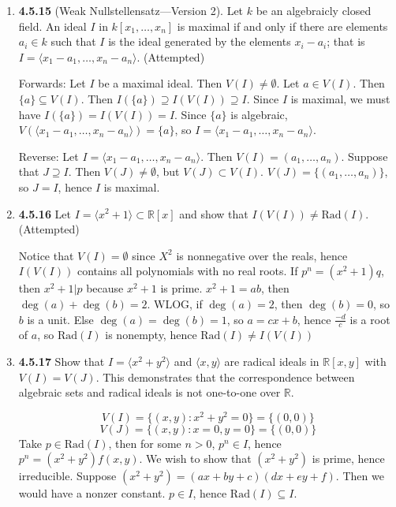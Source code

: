 \documentclass[12pt]{article}
\newcommand{\R}{\mathbb{R}}
\newcommand{\Rad}{\text{Rad}}
\begin{document}
\begin{enumerate}
 	\item \textbf{4.5.15} (Weak Nullstellensatz---Version 2).  Let $k$ be an algebraicly closed field.  An ideal $I$ in $k[x_1,\dots,x_n]$ is maximal if and only if there are elements $a_i\in k$ such that $I$ is the ideal generated by the elements $x_i-a_i$; that is $I=\langle x_1-a_1, \dots, x_n-a_n \rangle$.  (Attempted)
 	
 	  Forwards: Let $I$ be a maximal ideal.  Then $V(I)\neq \emptyset$.  Let $a \in V(I)$.  Then $\{a\}\subseteq V(I)$.  Then $I(\{a\}) \supseteq I(V(I)) \supseteq I$.  Since $I$ is maximal, we must have  $I(\{a\}) = I(V(I)) = I$.  Since $\{a\}$ is algebraic, $V(\langle x_1-a_1, \dots, x_n-a_n \rangle) = \{a\}$, so $I=\langle x_1-a_1, \dots, x_n-a_n \rangle$.
 	  
 	  Reverse: Let $I=\langle x_1-a_1, \dots, x_n-a_n \rangle$.  Then $V(I) = (a_1,\dots,a_n)$.  Suppose that $J\supseteq I$.  Then $V(J)\neq \emptyset$, but $V(J)\subset V(I)$.  $V(J) = \{(a_1,\dots, a_n)\}$, so $J=I$, hence $I$ is maximal.
 	
 	\item \textbf{4.5.16} Let $I=\langle x^2+1 \rangle \subset \R[x]$ and show that $I(V(I)) \neq \Rad(I)$. (Attempted)
 	
 	Notice that $V(I)=\emptyset$ since $X^2$ is nonnegative over the reals, hence $I(V(I))$ contains all polynomials with no real roots.  
 	If $p^n=(x^2+1)q$, then $x^2+1 | p$ because $x^2+1$ is prime.  $x^2+1=ab$, then $\deg(a)+\deg(b)=2$.  WLOG, if $\deg(a)=2$, then $\deg(b)=0$, so $b$ is a unit.  Else $\deg(a)=\deg(b)=1$, so $a=cx+b$, hence $\frac{-d}{c}$ is a root of $a$, so $\Rad(I)$ is nonempty, hence $\Rad(I)\neq I(V(I))$
 	
 	
 	
 	\item \textbf{4.5.17} Show that $I=\langle x^2 +y^2 \rangle$ and $\langle x,y \rangle$ are radical ideals in $\R[x,y]$ with $V(I)=V(J)$.  This demonstrates that the correspondence between algebraic sets and radical ideals is not one-to-one over $\R$.
 	
\[V(I) = \{(x,y): x^2+y^2=0\} = \{(0,0)\}\]
\[V(J) = \{(x,y): x=0, y=0\} = \{(0,0)\}\]
Take $p\in \Rad(I)$, then for some $n>0$, $p^n\in I$, hence $p^n=( x^2+y^2)f(x,y)$.  We wish to show that $( x^2+y^2)$ is prime, hence irreducible.  Suppose $( x^2+y^2) = (ax+by+c)(dx+ey+f)$.  Then we would have a nonzer constant.  $p\in I$, hence $\Rad(I)\subseteq I$.


\end{enumerate}
\end{document}
